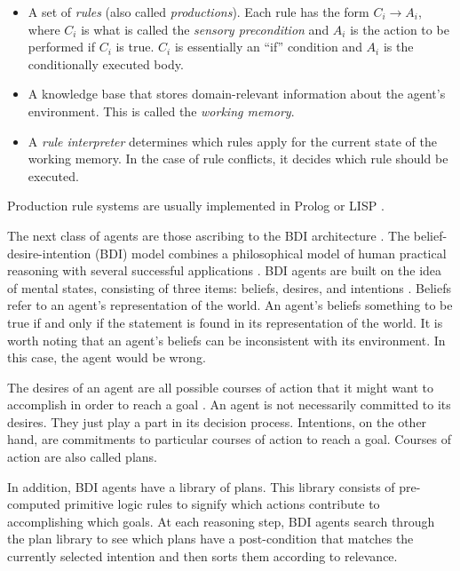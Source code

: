 \begin{itemize}

    \item A set of \textit{rules} (also called \textit{productions}).
        Each rule has the form $ C_i \rightarrow A_i $,
        where $ C_i $ is what is called the \textit{sensory precondition}
        and $ A_i $ is the action to be performed if $ C_i $ is true.
        $ C_i $ is essentially an ``if'' condition and $ A_i $ is the conditionally executed body.

    \item A knowledge base that stores domain-relevant information about the agent's environment.
        This is called the \textit{working memory}.

    \item A \textit{rule interpreter} determines which rules apply for the current state of the working memory.
        In the case of rule conflicts, it decides which rule should be executed.

\end{itemize}


Production rule systems are usually implemented in Prolog or LISP \cite{balke_how_2014}.

The next class of agents are those ascribing to the BDI architecture \cite{balke_how_2014}.
The belief-desire-intention (BDI) model combines a philosophical model of human practical reasoning
with several successful applications \cite{georgeff_belief-desire-intention_1999}.
BDI agents are built on the idea of mental states,
consisting of three items: beliefs, desires, and intentions \cite{balke_how_2014}.
Beliefs refer to an agent's representation of the world.
An agent's beliefs something to be true if and only if the statement is found in its representation of the world.
It is worth noting that an agent's beliefs can be inconsistent with its environment.
In this case, the agent would be wrong.

\cite{rao_modeling_1991}

The desires of an agent are all possible courses of action that it might want to accomplish in order to reach a goal \cite{balke_how_2014}.
An agent is not necessarily committed to its desires.
They just play a part in its decision process.
Intentions, on the other hand, are commitments to particular courses of action to reach a goal.
Courses of action are also called plans.

In addition, BDI agents have a library of plans.
This library consists of pre-computed primitive logic rules to signify which actions contribute to accomplishing which goals.
At each reasoning step, BDI agents search through the plan library to see which plans have a post-condition that matches the currently selected intention
and then sorts them according to relevance.

